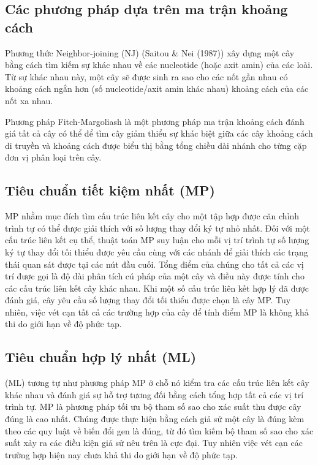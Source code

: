 \documentclass[12pt]{report}
\begin{document}
\subsection{Các phương pháp dựa trên ma trận khoảng cách}
Phương thức Neighbor-joining \cite{cia-11} (NJ) (Saitou & Nei (1987)) xây dựng một cây bằng cách tìm kiếm sự khác nhau về các nucleotide (hoặc axit amin) của các loài. Từ sự khác nhau này, một cây sẽ được sinh ra sao cho các nốt gần nhau có khoảng cách ngắn hơn (số nucleotide/axit amin khác nhau) khoảng cách của các nốt xa nhau.


Phương pháp Fitch-Margoliash \cite{cia-12} là một phương pháp ma trận khoảng cách đánh giá tất cả cây có thể để tìm cây giảm thiểu sự khác biệt giữa các cây khoảng cách di truyền và khoảng cách được biểu thị bằng tổng chiều dài nhánh cho từng cặp đơn vị phân loại trên cây.

\subsection{Tiêu chuẩn tiết kiệm nhất (MP)}
MP nhằm mục đích tìm cấu trúc liên kết cây cho một tập hợp được căn chỉnh trình tự có thể được giải thích với số lượng thay đổi ký tự nhỏ nhất. Đối với một cấu trúc liên kết cụ thể, thuật toán MP suy luận cho mỗi vị trí trình tự số lượng ký tự thay đổi tối thiểu được yêu cầu cùng với các nhánh để giải thích các trạng thái quan sát được tại các nút đầu cuối. Tổng điểm của chúng cho tất cả các vị trí được gọi là độ dài phân tích cú pháp của một cây và điều này được tính cho các cấu trúc liên kết cây khác nhau. Khi một số cấu trúc liên kết hợp lý đã được đánh giá, cây yêu cầu số lượng thay đổi tối thiểu được chọn là cây MP. Tuy nhiên, việc vét cạn tất cả các trường hợp của cây để tính điểm MP là không khả thi do giới hạn về độ phức tạp.

\subsection{Tiêu chuẩn hợp lý nhất (ML)}
(ML) tương tự như phương pháp MP ở chỗ nó kiểm tra các cấu trúc liên kết cây khác nhau và đánh giá sự hỗ trợ tương đối bằng cách tổng hợp tất cả các vị trí trình tự.
MP là phương pháp tối ưu bộ tham số sao cho xác suất thu được cây đúng là cao nhất. Chúng được thực hiện bằng cách giả sử một cây là đúng kèm theo các quy luật về biến đổi gen là đúng, từ đó tìm kiếm bộ tham số sao cho xác suất xảy ra các điều kiện giả sử nêu trên là cực đại. Tuy nhiên việc vét cạn các trường hợp hiện nay chưa khả thi do giới hạn về độ phức tạp.
\end{document}
